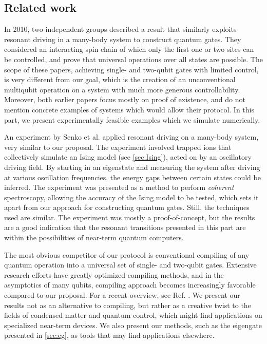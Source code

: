 \subsection{Related work}
In 2010, two independent groups \cite{Burgarth2010, Kay2010} described a result that similarly exploits resonant driving in a many-body system to construct quantum gates. They considered an interacting spin chain of which only the first one or two sites can be controlled, and prove that universal operations over all states are possible. The scope of these papers, achieving single- and two-qubit gates with limited control, is very different from our goal, which is the creation of an unconventional multiqubit operation on a system with much more generous controllability. Moreover, both earlier papers focus mostly on proof of existence, and do not mention concrete examples of systems which would allow their protocol. In this part, we present experimentally feasible examples which we simulate numerically. 

An experiment by Senko et al. \cite{Senko2014} applied resonant driving on a many-body system, very similar to our proposal. The experiment involved trapped ions that collectively simulate an Ising model (see \cref{sec:Ising}), acted on by an oscillatory driving field. By starting in an eigenstate and measuring the system after driving at various oscillation frequencies, the energy gaps between certain states could be inferred. The experiment was presented as a method to perform \emph{coherent} spectroscopy, allowing the accuracy of the Ising model to be tested, which sets it apart from our approach for constructing quantum gates. Still, the techniques used are similar. The experiment was mostly a proof-of-concept, but the results are a good indication that the resonant transitions presented in this part are within the possibilities of near-term quantum computers. 

The most obvious competitor of our protocol is conventional compiling of any quantum operation into a universal set of single- and two-qubit gates. Extensive research efforts have greatly optimized compiling methods, and in the asymptotics of many qubits, compiling approach becomes increasingly favorable compared to our proposal. For a recent overview, see Ref. \cite{Chong2017}. We present our results not as an alternative to compiling, but rather as a creative twist to the fields of condensed matter and quantum control, which might find applications on specialized near-term devices. We also present our methods, such as the eigengate presented in \cref{sec:eg}, as tools that may find applications elsewhere. 




